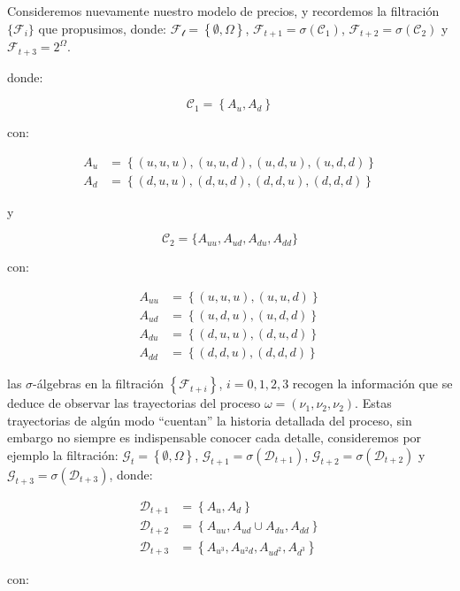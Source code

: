 \documentclass{extreport}
\theoremstyle{definicion}
\theoremstyle{propiedad}
\begin{document}
Consideremos nuevamente nuestro modelo de precios, y recordemos la filtración $\{\mathcal{F}_i\}$ que propusimos, donde: $\mathcal{F_t} = \left\{\emptyset, \Omega\right\}$, $\mathcal{F}_{t+1} = \sigma(\mathcal{C}_1)$, $\mathcal{F}_{t+2} = \sigma(\mathcal{C}_2)$ y $\mathcal{F}_{t+3} = 2^\Omega$.

donde:

 

$$
\mathcal{C}_1 = \left\{A_u, A_d\right\}
$$

con:


\begin{align*}
A_u & = \left\{(u,u,u),(u,u,d),(u,d,u),(u,d,d)\right\} \\
A_d & = \left\{(d,u,u),(d,u,d),(d,d,u),(d,d,d)\right\} 
\end{align*}


y 

$$
\mathcal{C}_2= \{A_{uu}, A_{ud}, A_{du}, A_{dd}\}
$$

con:


\begin{align*}
A_{uu} & = \left\{(u,u,u),(u,u,d)\right\} \\
A_{ud} & = \left\{(u,d,u),(u,d,d)\right\}\\ 
A_{du} & = \left\{(d,u,u),(d,u,d)\right\} \\
A_{dd} & = \left\{(d,d,u),(d,d,d)\right\}
\end{align*}


las $\sigma$-álgebras en la filtración $\left\{\mathcal{F}_{t+i}\right\}$, $i=0,1,2,3$ recogen la información que se deduce de observar las trayectorias del proceso $\omega = (\nu_1, \nu_2, \nu_2)$.  Estas trayectorias de algún modo “cuentan” la historia detallada del proceso, sin embargo no siempre es indispensable conocer cada detalle, consideremos por ejemplo la filtración: $\mathcal{G}_t = \left\{\emptyset, \Omega\right\}$, $\mathcal{G}_{t+1} = \sigma(\mathcal{D}_{t+1})$, $\mathcal{G}_{t+2} = \sigma(\mathcal{D}_{t+2})$ y $\mathcal{G}_{t+3} = \sigma(\mathcal{D}_{t+3})$, donde:


\begin{align*}
\mathcal{D}_{t+1} & = \left\{A_u, A_d\right\}\\
\mathcal{D}_{t+2} & = \left\{A_{uu}, A_{ud}\cup A_{du}, A_{dd}\right\}\\
\mathcal{D}_{t+3}&  = \left\{A_{u^3}, A_{u^2d}, A_{ud^2}, A_{d^3}\right\}
\end{align*}


con:
\end{document}
